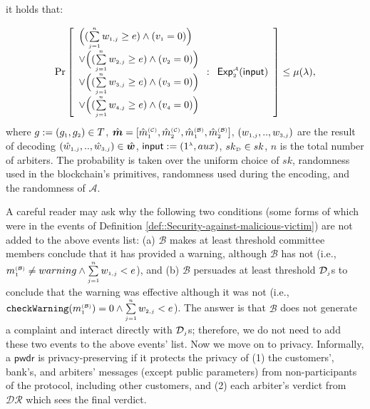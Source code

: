 \begin{definition}
it holds that:

$$ \Pr\left[
  \begin{array}{l}
  
 
\Big( (\sum\limits_{\st j=1}^{\st n}w_{\st 1,j}\geq e) \wedge ( v_{\st 1}=0)\Big) \\
 
 \vee \Big(( \sum\limits_{\st j=1}^{\st n}w_{\st 2,j}\geq e) \wedge ( v_{\st 2}=0)\Big) \\
 \vee  \Big(( \sum\limits_{\st j=1}^{\st n}w_{\st 3,j}\geq e) \wedge ( v_{\st 3}=0)\Big) \\
  \vee  \Big(( \sum\limits_{\st j=1}^{\st n}w_{\st 4,j}\geq e) \wedge ( v_{\st 4}=0)\Big) \\
\end{array} :
    \begin{array}{l}
    \mathsf{Exp}_{\st 2}^{\st\mathcal{A}}(\mathsf{input})\\
\end{array}    \right]\leq \mu(\lambda),$$
where $g:=(g_{\st 1}, g_{\st 2})\in T$, $\hat {\bm m}=[\hat {m}^{\st (\mathcal{C})}_{\st 1}, \hat {m}^{\st (\mathcal{C})}_{\st 2}, \hat {m}^{\st (\mathcal{B})}_{\st 1}, \hat {m}^{\st (\mathcal{B})}_{\st 2}]$, $(w_{\st 1,j},..,w_{\st 3,j})$ are the result of decoding   $(\hat w_{\st 1,j},..,\hat w_{\st 3,j})\in \hat {\bm w}$, $\mathsf{input}:=(1^{\st\lambda},  {aux})$, $ sk_{\st \mathcal{D}}\in sk$, $n$ is the total number of arbiters. The probability is taken over the uniform choice of $sk$, randomness used in the blockchain's primitives, randomness used during the encoding, and  the randomness of $\mathcal{A}$. 
\end{definition}


A careful reader may ask why the following two conditions (some forms of which were in the events of Definition \ref{def::Security-against-malicious-victim}) are not added to the above events list: (a) $\mathcal{B}$ makes at least threshold committee members conclude that it  has provided a warning, although $\mathcal{B}$ has not (i.e., $ m^{\scriptscriptstyle\mathcal{(B)}}_{\scriptscriptstyle1}\neq warning \wedge \sum\limits_{\scriptscriptstyle j=1}^{\scriptscriptstyle n}w_{\scriptscriptstyle 1,j}<  e$), and (b) $\mathcal{B}$ persuades at least threshold $\mathcal{D}_{\scriptscriptstyle j}$s  to conclude that the warning was effective although it was not (i.e., $\mathtt{checkWarning}(m^{\scriptscriptstyle\mathcal{(B)}}_{\scriptscriptstyle1})= 0 \wedge \sum\limits_{\scriptscriptstyle j=1}^{\scriptscriptstyle n}w_{\scriptscriptstyle 2,j}< e$). The answer is that  $\mathcal{B}$ does not generate a complaint  and interact directly with $\mathcal{D}_{\scriptscriptstyle j}$s; therefore, we do not need to add these two events to the above events' list. Now we move on to privacy. Informally, a $\mathsf{pwdr}$ is privacy-preserving if it protects the privacy of (1) the customers', bank's, and arbiters' messages (except public parameters) from  non-participants of the protocol, including other customers, and (2) each   arbiter's verdict from $\mathcal{DR}$  which sees the final verdict. 




